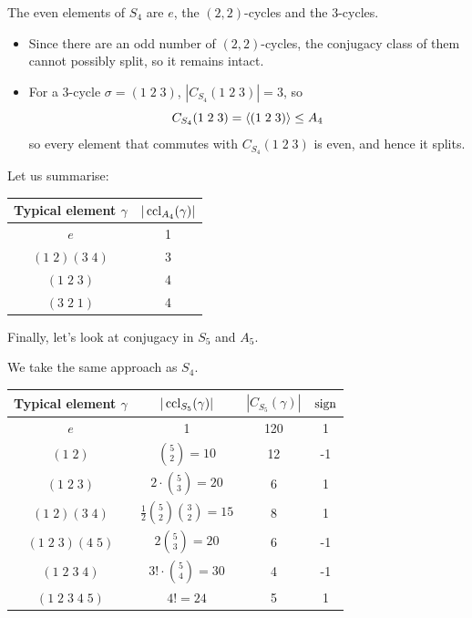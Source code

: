 \documentclass{../template/note}
\begin{document}
    \begin{example}[\(A_4\)]
        The even elements of \(S_4\) are \(e\), the \((2, 2)\)-cycles and the 3-cycles.
        \begin{itemize}
            \item Since there are an odd number of \((2, 2)\)-cycles, the conjugacy class of them cannot possibly split, so it remains intact.
            \item For a 3-cycle \(\sigma = (1 \; 2 \; 3)\), \(|C_{S_4}(1 \; 2 \; 3)| = 3\), so
            \[
                C_{S_4}(1 \; 2 \; 3) = \left \langle (1 \; 2 \; 3) \right \rangle \leq A_4
            \]
            so every element that commutes with \(C_{S_4}(1 \; 2 \; 3)\) is even, and hence it splits.
        \end{itemize}
        Let us summarise:
        \begin{center}
            \begin{tabular}{c | c}
                Typical element \(\gamma\) & \(|\operatorname{ccl}_{A_4}(\gamma)|\) \\
                \hline
                \(e\) & 1 \\
                \((1 \; 2)(3 \; 4)\) & 3 \\
                \((1 \; 2 \; 3)\) & 4 \\
                \((3 \; 2 \; 1)\) & 4 \\
            \end{tabular}
        \end{center}
    \end{example}

    
    Finally, let's look at conjugacy in \(S_5\) and \(A_5\).

    \begin{example}[Conjugacy in \(S_5\)]
        We take the same approach as \(S_4\).
        \begin{center}
            \begin{tabular}{c | c | c | c}
                Typical element \(\gamma\) & \(|\operatorname{ccl}_{S_5}(\gamma)|\) & \(|C_{S_5}(\gamma)|\) & \(\operatorname{sign}\) \\
                \hline
                \(e\) & 1 & 120 & 1 \\
                \((1 \; 2)\) & \(\binom 5 2 = 10\) & 12 & -1 \\
                \((1 \; 2 \; 3)\) & \(2 \cdot \binom 5 3 = 20\) & 6 & 1 \\
                \((1 \; 2)(3 \; 4)\) & \(\frac 1 2 \binom 5 2 \binom 3 2 = 15\) & 8 & 1 \\
                \((1 \; 2 \; 3)(4 \; 5)\) & \(2 \binom 5 3 = 20\) & 6 & -1 \\
                \((1 \; 2 \; 3 \; 4)\) & \(3! \cdot \binom 5 4 = 30\) & 4 & -1 \\
                \((1 \; 2 \; 3 \; 4 \; 5)\) & \(4! = 24\) & 5 & 1 \\
            \end{tabular}
        \end{center}
    \end{example}
    
\end{document}
